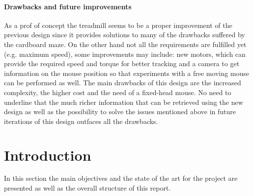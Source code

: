 \documentclass[12pt,a4paper, twoside]{article}
\begin{document}
\begin{multicols}{2}
\paragraph{Drawbacks and future improvements}
As a prof of concept the treadmill seems to be a proper improvement of the previous design since it provides solutions to many of the drawbacks suffered by the cardboard maze. On the other hand not all the requirements are fulfilled yet (e.g. maximum speed), some improvements may include: new motors, which can provide the required speed and torque for better tracking and a camera to get information on the mouse position so that experiments with a free moving mouse can be performed as well. The main drawbacks of this design are the increased complexity, the higher cost and the need of a fixed-head mouse. No need to underline that the much richer information that can be retrieved using the new design as well as the possibility to solve the issues mentioned above in future iterations of this design outfaces all the drawbacks.  



\end{multicols}
\restoregeometry %
\clearpage
\lfoot{ }
\rfoot{ }
\chead{ }


\pagestyle{plain}
\clearpage

\tableofcontents
\clearpage
\pagestyle{fancy}
\section{Introduction}\label{sec:intro}
In this section the main objectives and the state of the art for the project are presented as well as the overall structure of this report.
\end{document}
